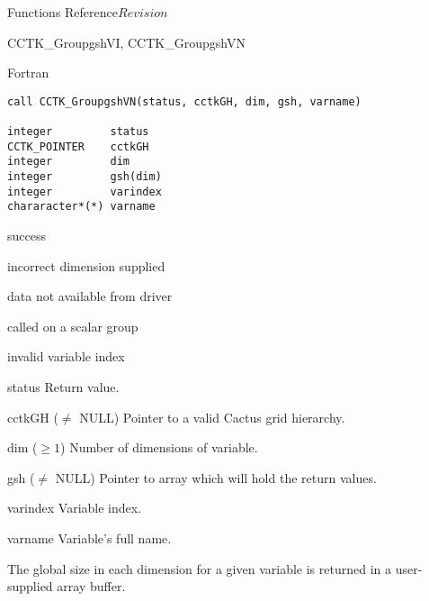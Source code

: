 \begin{cactuspart}{ Functions Reference}{}{$Revision$}
\begin{FunctionDescription}{CCTK\_GroupgshVI, CCTK\_GroupgshVN}
\begin{SynopsisSection}
\begin{Synopsis}{Fortran}
\begin{verbatim}
call CCTK_GroupgshVN(status, cctkGH, dim, gsh, varname)

integer         status
CCTK_POINTER    cctkGH
integer         dim
integer         gsh(dim)
integer         varindex
chararacter*(*) varname
\end{verbatim}
\end{Synopsis}
\end{SynopsisSection}

\begin{ResultSection}
\begin{Result}{0} success \end{Result}
\begin{Result}{-1} incorrect dimension supplied \end{Result}
\begin{Result}{-2} data not available from driver \end{Result}
\begin{Result}{-3} called on a scalar group \end{Result}
\begin{Result}{-4} invalid variable index \end{Result}
\end{ResultSection}

\begin{ParameterSection}
\begin{Parameter}{status} Return value. \end{Parameter}
\begin{Parameter}{cctkGH ($\ne$ NULL)} Pointer to a valid Cactus grid hierarchy. \end{Parameter}
\begin{Parameter}{dim ($\ge 1$)} Number of dimensions of variable. \end{Parameter}
\begin{Parameter}{gsh ($\ne$ NULL)} Pointer to array which will hold the return values. \end{Parameter}
\begin{Parameter}{varindex} Variable index. \end{Parameter}
\begin{Parameter}{varname} Variable's full name. \end{Parameter}
\end{ParameterSection}

\begin{Discussion}
The global size in each dimension for a given variable is returned in a user-supplied array buffer.
\end{Discussion}


\end{FunctionDescription}
\end{cactuspart}
